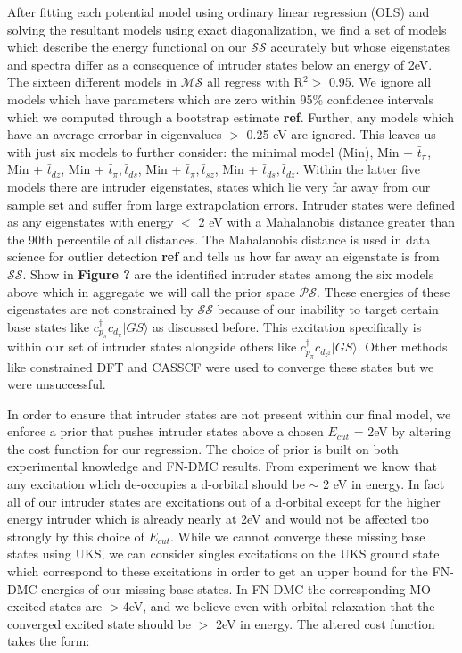 \documentclass{article}
\begin{document}
After fitting each potential model using ordinary linear regression (OLS) and solving the resultant models using exact diagonalization, we find a set of models which describe the energy functional on our $\mathcal{SS}$ accurately but whose eigenstates and spectra differ as a consequence of intruder states below an energy of 2eV. The sixteen different models in $\mathcal{MS}$ all regress with R$^2 >$  0.95. We ignore all models which have parameters which are zero within 95\% confidence intervals which we computed through a bootstrap estimate \textbf{ref}. Further, any models which have an average errorbar in eigenvalues $>$ 0.25 eV are ignored. This leaves us with just six models to further consider: the minimal model (Min), Min + $\bar{t}_\pi$, Min + $\bar{t}_{dz}$, Min + $\bar{t}_\pi, \bar{t}_{ds}$, Min + $\bar{t}_\pi, \bar{t}_{sz}$, Min + $\bar{t}_{ds}, \bar{t}_{dz}$. Within the latter five models there are intruder eigenstates, states which lie very far away from our sample set and suffer from large extrapolation errors. Intruder states were defined as any eigenstates with energy $< $ 2 eV with a Mahalanobis distance greater than the 90th percentile of all distances. The Mahalanobis distance is used in data science for outlier detection \textbf{ref} and tells us how far away an eigenstate is from $\mathcal{SS}$. Show in \textbf{Figure ?} are the identified intruder states among the six models above which in aggregate we will call the prior space $\mathcal{PS}$. These energies of these eigenstates are not constrained by $\mathcal{SS}$ because of our inability to target certain base states like $c^\dagger_{p_\pi} c_{d_\pi} |GS\rangle$ as discussed before. This excitation specifically is within our set of intruder states alongside others like $c^\dagger_{p_\pi} c_{d_{z^2}} |GS\rangle$.
Other methods like constrained DFT and CASSCF were used to converge these states but we were unsuccessful. 

In order to ensure that intruder states are not present within our final model, we enforce a prior that pushes intruder states above a chosen $E_{cut}$ = 2eV by altering the cost function for our regression. The choice of prior is built on both experimental knowledge and FN-DMC results. From experiment we know that any excitation which de-occupies a d-orbital should be $\sim$ 2 eV in energy. In fact all of our intruder states are excitations out of a d-orbital except for the higher energy intruder which is already nearly at 2eV and would not be affected too strongly by this choice of $E_{cut}$. While we cannot converge these missing base states using UKS, we can consider singles excitations on the UKS ground state which correspond to these excitations in order to get an upper bound for the FN-DMC energies of our missing base states. In FN-DMC the corresponding MO excited states are $> $4eV, and we believe even with orbital relaxation that the converged excited state should be $>$ 2eV in energy. The altered cost function takes the form:
\end{document}
